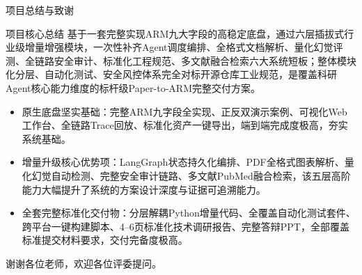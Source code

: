 ﻿\documentclass[UTF8,aspectratio=169]{ctexbeamer}
\begin{document}
\begin{frame}{项目总结与致谢}
  \begin{block}{项目核心总结}
    基于一套完整实现ARM九大字段的高稳定底盘，通过六层插拔式行业级增量增强模块，一次性补齐Agent调度编排、全格式文档解析、量化幻觉评测、全链路安全审计、标准化工程规范、多文献融合检索六大系统短板；整体模块化分层、自动化测试、安全风控体系完全对标开源仓库工业规范，是覆盖科研Agent核心能力维度的标杆级Paper-to-ARM完整交付方案。
  \end{block}
  \begin{itemize}
    \item 原生底盘坚实基础：完整ARM九字段全实现、正反双演示案例、可视化Web工作台、全链路Trace回放、标准化资产一键导出，端到端完成度极高，夯实系统基础。
    \item 增量升级核心优势项：LangGraph状态持久化编排、PDF全格式图表解析、量化幻觉自动检测、完整安全审计链路、多文献PubMed融合检索，该五层高阶能力大幅提升了系统的方案设计深度与证据可追溯能力。
    \item 全套完整标准化交付物：分层解耦Python增量代码、全覆盖自动化测试套件、跨平台一键构建脚本、4–6页标准化技术调研报告、完整答辩PPT，全部覆盖标准提交材料要求，交付完备度极高。
  \end{itemize}
  \centering 谢谢各位老师，欢迎各位评委提问。
\end{frame}
\end{document}
